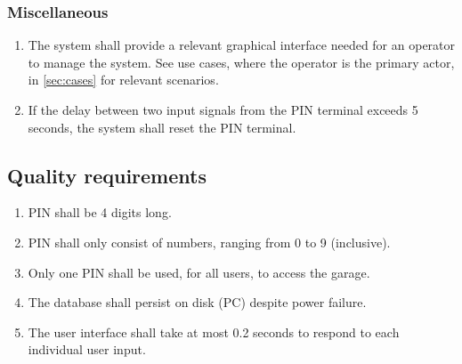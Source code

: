 \documentclass[12pt,titlepage,bibliography=totoc]{article}
\begin{document}
\subsubsection{Miscellaneous}
\begin{enumerate}
	\item The system shall provide a relevant graphical interface needed for an operator to manage the system. See use cases, where the operator is the primary actor, in \cref{sec:cases} for relevant scenarios.
	\item If the delay between two input signals from the PIN terminal exceeds 5 seconds, the system shall reset the PIN terminal.
\end{enumerate}
\subsection{Quality requirements}
\begin{enumerate}
	\item PIN shall be 4 digits long.
	\item PIN shall only consist of numbers, ranging from 0 to 9 (inclusive).
	\item Only one PIN shall be used, for all users, to access the garage.
	\item The database shall persist on disk (PC) despite power failure.
	\item The user interface shall take at most 0.2 seconds to respond to each individual user input.
\end{enumerate}
{}


\end{document}
